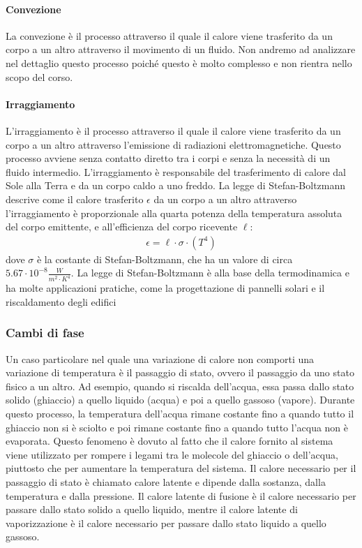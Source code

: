                 \paragraph{Convezione}
                    La convezione è il processo attraverso il quale il calore viene trasferito da un corpo a un altro attraverso il movimento di un fluido. Non andremo ad analizzare nel dettaglio questo processo poiché questo è molto complesso e non rientra nello scopo del corso.
                \paragraph{Irraggiamento}
                    L'irraggiamento è il processo attraverso il quale il calore viene trasferito da un corpo a un altro attraverso l'emissione di radiazioni elettromagnetiche. Questo processo avviene senza contatto diretto tra i corpi e senza la necessità di un fluido intermedio. L'irraggiamento è responsabile del trasferimento di calore dal Sole alla Terra e da un corpo caldo a uno freddo. La legge di Stefan-Boltzmann descrive come il calore trasferito $\epsilon$ da un corpo a un altro attraverso l'irraggiamento è proporzionale alla quarta potenza della temperatura assoluta del corpo emittente, e all'efficienza del corpo ricevente $\ell$:
                    \begin{align*}
                        \epsilon = \ell \cdot \sigma \cdot (T^4)
                    \end{align*}
                    dove $\sigma$ è la costante di Stefan-Boltzmann, che ha un valore di circa $5.67 \cdot 10^{-8} \frac{W}{m^2 \cdot K^4}$. La legge di Stefan-Boltzmann è alla base della termodinamica e ha molte applicazioni pratiche, come la progettazione di pannelli solari e il riscaldamento degli edifici
        \subsubsection{Cambi di fase}
            Un caso particolare nel quale una variazione di calore non comporti una variazione di temperatura è il passaggio di stato, ovvero il passaggio da uno stato fisico a un altro. Ad esempio, quando si riscalda dell'acqua, essa passa dallo stato solido (ghiaccio) a quello liquido (acqua) e poi a quello gassoso (vapore). Durante questo processo, la temperatura dell'acqua rimane costante fino a quando tutto il ghiaccio non si è sciolto e poi rimane costante fino a quando tutto l'acqua non è evaporata. Questo fenomeno è dovuto al fatto che il calore fornito al sistema viene utilizzato per rompere i legami tra le molecole del ghiaccio o dell'acqua, piuttosto che per aumentare la temperatura del sistema. Il calore necessario per il passaggio di stato è chiamato calore latente e dipende dalla sostanza, dalla temperatura e dalla pressione. Il calore latente di fusione è il calore necessario per passare dallo stato solido a quello liquido, mentre il calore latente di vaporizzazione è il calore necessario per passare dallo stato liquido a quello gassoso.
